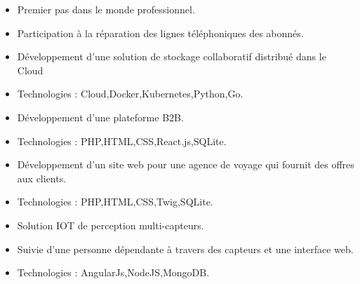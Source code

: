 
\begin{itemize}
\item Premier pas dans le monde professionnel.
\item Participation à la réparation des lignes téléphoniques des abonnés.
\end{itemize}


\begin{itemize}
\item Développement d'une solution de stockage collaboratif distribué dans le Cloud
\item Technologies : Cloud,Docker,Kubernetes,Python,Go.
\end{itemize}

\divider

\begin{itemize}
\item Développement d'une plateforme B2B.
\item Technologies : PHP,HTML,CSS,React.js,SQLite.
\end{itemize}

\divider

\begin{itemize}
\item Développement d'un site web pour une agence de voyage qui fournit des offres aux clients.
\item Technologies : PHP,HTML,CSS,Twig,SQLite.
\end{itemize}

\divider

\begin{itemize}
\item Solution IOT de perception multi-capteurs.
\item Suivie d'une personne dépendante à travers des capteurs et une interface web.    
\item Technologies : AngularJs,NodeJS,MongoDB.
\end{itemize}


